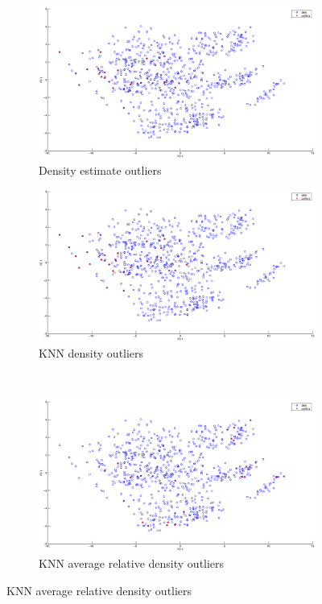 \begin{figure}[htbp]
        \center
       	\begin{subfigure}[b]{0.55\textwidth}
                \includegraphics[width=10cm]{figures/pc1.eps}
                \caption{Density estimate outliers}
        \end{subfigure}%
        \quad
        \begin{subfigure}[b]{0.55\textwidth}
                \includegraphics[width=10cm]{figures/pc2.eps}
                \caption{KNN density outliers}
         \end{subfigure} \\
	 \begin{subfigure}[b]{0.55\textwidth}
                 \linespread{1}
                \includegraphics[width=10cm]{figures/pc3.eps}
                \caption{KNN average relative density outliers }
        \end{subfigure}

\end{figure}
